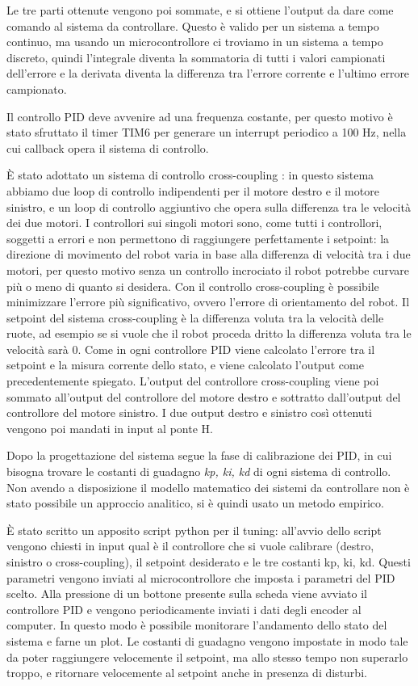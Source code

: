 Le tre parti ottenute vengono poi sommate, e si ottiene l'output da dare come comando al sistema da controllare. Questo è valido per un sistema a tempo continuo, ma usando un microcontrollore ci troviamo in un sistema a tempo discreto, quindi l'integrale diventa la sommatoria di tutti i valori campionati dell'errore e la derivata diventa la differenza tra l'errore corrente e l'ultimo errore campionato.

Il controllo PID deve avvenire ad una frequenza costante, per questo motivo è stato sfruttato il timer TIM6 per generare un interrupt periodico a 100 Hz, nella cui callback opera il sistema di controllo.

È stato adottato un sistema di controllo cross-coupling \cite{cross_pid}: in questo sistema abbiamo due loop di controllo indipendenti per il motore destro e il motore sinistro, e un loop di controllo aggiuntivo che opera sulla differenza tra le velocità dei due motori. I controllori sui singoli motori sono, come tutti i controllori, soggetti a errori e non permettono di raggiungere perfettamente i setpoint: la direzione di movimento del robot varia in base alla differenza di velocità tra i due motori, per questo motivo senza un controllo incrociato il robot potrebbe curvare più o meno di quanto si desidera. Con il controllo cross-coupling è possibile minimizzare l'errore più significativo, ovvero l'errore di orientamento del robot.
Il setpoint del sistema cross-coupling è la differenza voluta tra la velocità delle ruote, ad esempio se si vuole che il robot proceda dritto la differenza voluta tra le velocità sarà 0. Come in ogni controllore PID viene calcolato l'errore tra il setpoint e la misura corrente dello stato, e viene calcolato l'output come precedentemente spiegato. L'output del controllore cross-coupling viene poi sommato all'output del controllore del motore destro e sottratto dall'output del controllore del motore sinistro. I due output destro e sinistro così ottenuti vengono poi mandati in input al ponte H.

Dopo la progettazione del sistema segue la fase di calibrazione dei PID, in cui bisogna trovare le costanti di guadagno \textit{kp, ki, kd} di ogni sistema di controllo. Non avendo a disposizione il modello matematico dei sistemi da controllare non è stato possibile un approccio analitico, si è quindi usato un metodo empirico.

È stato scritto un apposito script python per il tuning: all'avvio dello script vengono chiesti in input qual è il controllore che si vuole calibrare (destro, sinistro o cross-coupling), il setpoint desiderato e le tre costanti kp, ki, kd. Questi parametri vengono inviati al microcontrollore che imposta i parametri del PID scelto. Alla pressione di un bottone presente sulla scheda viene avviato il controllore PID e vengono periodicamente inviati i dati degli encoder al computer. In questo modo è possibile monitorare l'andamento dello stato del sistema e farne un plot. Le costanti di guadagno vengono impostate in modo tale da poter raggiungere velocemente il setpoint, ma allo stesso tempo non superarlo troppo, e ritornare velocemente al setpoint anche in presenza di disturbi. 

